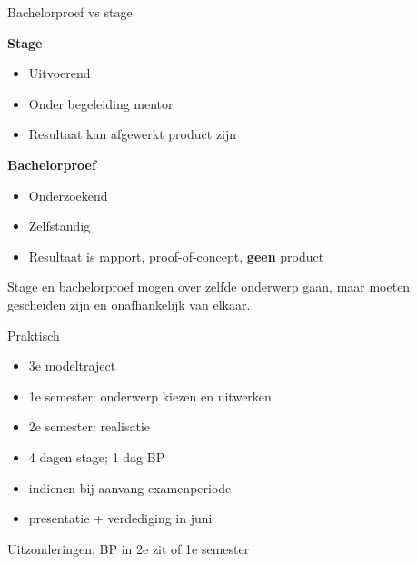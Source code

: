 \documentclass[aspectratio=169,usenames,dvipsnames]{beamer}
\begin{document}
\begin{frame}{Bachelorproef vs stage}

  \begin{multicols}{2}
    \textbf{Stage}
    
    \begin{itemize}
      \item Uitvoerend
      \item Onder begeleiding mentor
      \item Resultaat kan afgewerkt product zijn
    \end{itemize}
    
    \columnbreak
    
    \textbf{Bachelorproef}
    
    \begin{itemize}
      \item Onderzoekend
      \item Zelfstandig
      \item Resultaat is rapport, proof-of-concept, \textbf{geen} product
    \end{itemize}
  \end{multicols}

Stage en bachelorproef mogen over zelfde onderwerp gaan, maar moeten gescheiden zijn en onafhankelijk van elkaar.

\end{frame}

\begin{frame}{Praktisch}
  
  \begin{itemize}
    \item 3e modeltraject
    \item 1e semester: onderwerp kiezen en uitwerken
    \item 2e semester: realisatie
    \item 4 dagen stage; 1 dag BP
    \item indienen bij aanvang examenperiode
    \item presentatie + verdediging in juni
  \end{itemize}

Uitzonderingen: BP in 2e zit of 1e semester
\end{frame}
\end{document}

